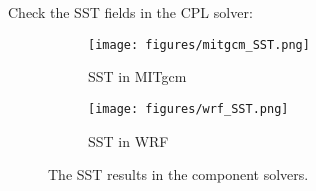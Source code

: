 
Check the SST fields in the CPL solver:

\begin{figure}[h!]
\centering
  \begin{subfigure}[b]{0.4\linewidth}
  \texttt{[image: figures/mitgcm\_SST.png]}
  \caption{SST in MITgcm}
  \end{subfigure}
  \begin{subfigure}[b]{0.4\linewidth}
  \texttt{[image: figures/wrf\_SST.png]}
  \caption{SST in WRF}
  \end{subfigure}
\caption{The SST results in the component solvers.}
\label{fig:sst}
\end{figure}

